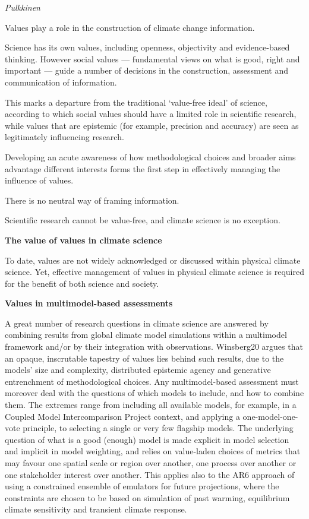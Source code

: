 \documentclass[
]{book}
\begin{document}
\emph{Pulkkinen}

Values play a role in the construction of climate change information.

Science has its own values, including openness, objectivity and evidence-based thinking. However social values --- fundamental views on what is good, right and important --- guide a number of decisions in the construction, assessment and communication of information.

This marks a departure from the traditional `value-free ideal' of science, according to which social values should have a limited role in scientific research, while values that are epistemic (for example, precision and accuracy) are seen as legitimately influencing research.

Developing an acute awareness of how methodological choices and broader aims advantage different interests forms the first step in effectively managing the influence of values.

There is no neutral way of framing information.

Scientific research cannot be value-free, and climate science is no exception.

\textbf{The value of values in climate science}

To date, values are not widely acknowledged or discussed within physical climate science. Yet, effective management of values in physical climate science is required for the benefit of both science and society.

\textbf{Values in multimodel-based assessments}

A great number of research questions in climate science are answered by combining results from global climate model simulations within a multimodel framework and/or by their integration with observations. Winsberg20 argues that an opaque, inscrutable tapestry of values lies behind such results, due to the models' size and complexity, distributed epistemic agency and generative entrenchment of methodological choices. Any multimodel-based assessment must moreover deal with the questions of which models to include, and how to combine them. The extremes range from including all available models, for example, in a Coupled Model
Intercomparison Project context, and applying a one-model-one-vote principle, to selecting a single or very few flagship models. The underlying question of what is a good (enough) model is made explicit in model selection and implicit in model weighting, and relies on value-laden choices of metrics that may favour one spatial scale or region over another, one process over another or one stakeholder interest over another. This applies also to the AR6 approach of using a constrained ensemble of emulators for future projections, where the constraints are chosen to be based on simulation of past warming, equilibrium climate sensitivity and transient climate response.
\end{document}
